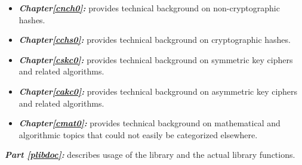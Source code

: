 \begin{itemize}
      on the generation of random and pseudo-random numbers.  
\item \emph{\textbf{Chapter\postchapterwordnonstretchable{}\ref{cnch0}: 
      \cnchzerolongtitlenoemph{}}} provides technical background on 
      non-cryptographic hashes.  
\item \emph{\textbf{Chapter\postchapterwordnonstretchable{}\ref{cchs0}: 
      \cchszerolongtitlenoemph{}}} provides technical background on cryptographic 
      hashes.  
\item \emph{\textbf{Chapter\postchapterwordnonstretchable{}\ref{cskc0}: 
      \cskczerolongtitlenoemph{}}} provides technical background on 
      symmetric key ciphers and related algorithms.  
\item \emph{\textbf{Chapter\postchapterwordnonstretchable{}\ref{cakc0}: 
      \cakczerolongtitlenoemph{}}} provides technical background on 
      asymmetric key ciphers and related algorithms.  
\item \emph{\textbf{Chapter\postchapterwordnonstretchable{}\ref{cmat0}: 
      \cmatzerolongtitlenoemph{}}} provides technical 
      background on mathematical and algorithmic topics that could not easily be 
      categorized elsewhere.  
\end{itemize}

\emph{\textbf{Part \ref{plibdoc}: \plibdoclongtitle{}}} describes
usage of the library and the actual library functions.

